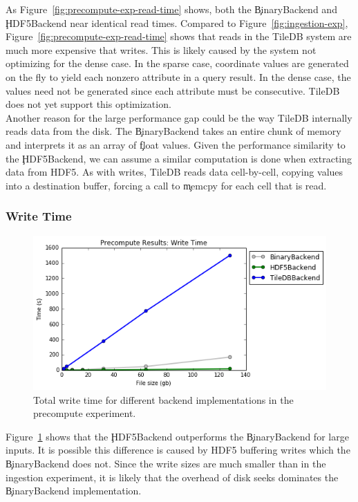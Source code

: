 As Figure~\ref{fig:precompute-exp-read-time} shows, both the \c{BinaryBackend}
and \c{HDF5Backend} near identical read times. Compared to
Figure~\ref{fig:ingestion-exp}, Figure~\ref{fig:precompute-exp-read-time} shows
that reads in the TileDB system are much more expensive that writes. This is
likely caused by the system not optimizing for the dense case. In the sparse
case, coordinate values are generated on the fly to yield each nonzero
attribute in a query result. In the dense case, the values need not be
generated since each attribute must be consecutive. TileDB does not yet support
this optimization. \\

Another reason for the large performance gap could be the way TileDB internally
reads data from the disk. The \c{BinaryBackend} takes an entire chunk of memory
and interprets it as an array of \c{float} values. Given the performance
similarity to the \c{HDF5Backend}, we can assume a similar computation is done
when extracting data from HDF5. As with writes, TileDB reads data cell-by-cell,
copying values into a destination buffer, forcing a call to \c{memcpy} for each
cell that is read.

\subsubsection{Write Time}

\begin{figure}[h]
\begin{center}
\includegraphics[scale=0.75]{./img/precompute-exp-write-time.png}
\caption{Total write time for different backend implementations in the
  precompute experiment.}
\label{fig:precompute-exp-write-time}
\end{center}
\end{figure}

Figure~\ref{fig:precompute-exp-write-time} shows that the \c{HDF5Backend}
outperforms the \c{BinaryBackend} for large inputs. It is possible this
difference is caused by HDF5 buffering writes which the \c{BinaryBackend} does
not. Since the write sizes are much smaller than in the ingestion experiment,
it is likely that the overhead of disk seeks dominates the \c{BinaryBackend}
implementation. \\

